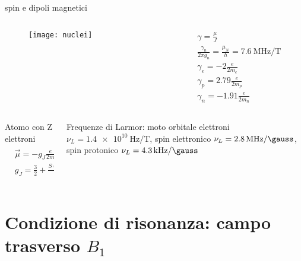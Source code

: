 \begin{wordonframe}{spin e dipoli magnetici}

\begin{columns}\begin{column}{0.5\textwidth}
\begin{figure}[!ht]\texttt{[image: nuclei]}\label{fig:nuclei}\end{figure}
\end{column} \begin{column}{0.5\textwidth}
\begin{align*}
&\gamma=\frac{\mu}{J}\\
&\frac{\gamma_n}{2\pi g_n}=\frac{\mu_N}{h}=\SI{7.6}{\mega\hertz\per\tesla}\\
&\gamma_e=-2 \frac{e}{2m_e}\\
&\gamma_p=2.79\frac{e}{2m_p}\\
&\gamma_n=-1.91\frac{e}{2m_n}
\end{align*}
\end{column}\end{columns}
\begin{columns}  \begin{column}{0.5\textwidth}
Atomo con Z elettroni
\begin{align*}
&\vec{\mu}=-g_J \frac{e}{2m}\vec{J}\\
&g_J=\frac{3}{2}+\frac{S(S+1)-L(L+1)}{J(J+1)}
\end{align*}

\end{column} \begin{column}{0.5\textwidth}
Frequenze di Larmor: moto orbitale elettroni $\nu_L=\SI{1.4e10}{\hertz\per\tesla}$, spin elettronico $\nu_L=\SI{2.8}{\mega\hertz\per\gauss}$, spin protonico $\nu_L=\SI{4.3}{\kilo\hertz\per\gauss}$
\end{column}  \end{columns}
\end{wordonframe}

\section{Condizione di risonanza: campo trasverso $B_1$}

